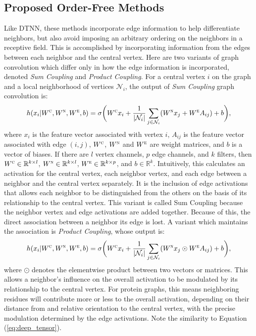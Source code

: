 \subsection{Proposed Order-Free Methods}
Like DTNN, these methods incorporate edge information to help differentiate neighbors, but also avoid imposing an arbitrary ordering on the neighbors in a receptive field.
This is accomplished by incorporating information from the edges between each neighbor and the central vertex.
Here are two variants of graph convolution which differ only in how the edge information is incorporated, denoted \textit{Sum Coupling} and \textit{Product Coupling}.
For a central vertex $i$ on the graph and a local neighborhood of vertices $\mathcal{N}_i$, the output of \emph{Sum Coupling} graph convolution is:
\begin{equation}
h(x_i | W^\textsc{c}, W^\textsc{n}, W^\textsc{e}, b) = \sigma \bigg( W^{\textsc{c}} x_i + \frac{1}{|\mathcal{N}_i|}\sum_{j \in \mathcal{N}_i} (W^{\textsc{n}} x_j + W^{\textsc{e}} A_{ij}) + b \bigg),
\label{eq:sum_coupling}
\end{equation}
where $x_i$ is the feature vector associated with vertex $i$, $A_{ij}$ is the feature vector associated with edge $(i, j)$, $W^\textsc{c}$, $W^\textsc{n}$ and $W^\textsc{e}$ are weight matrices, and $b$ is a vector of biases. 
If there are $l$ vertex channels, $p$ edge channels, and $k$ filters, then $W^\textsc{c}\in\mathbb{R}^{k \times l}$, $W^\textsc{n}\in\mathbb{R}^{k \times l}$, $W^\textsc{e}\in\mathbb{R}^{k \times p}$, and $b\in\mathbb{R}^{k}$.
Intuitively, this calculates an activation for the central vertex, each neighbor vertex, and each edge between a neighbor and the central vertex separately.
It is the inclusion of edge activations that allows each neighbor to be distinguished from the others on the basis of its relationship to the central vertex.
This variant is called Sum Coupling because the neighbor vertex and edge activations are added together.
Because of this, the direct association between a neighbor its edge is lost.
A variant which maintains the association is \emph{Product Coupling}, whose output is:
\begin{equation}
h(x_i | W^\textsc{c}, W^\textsc{n}, W^\textsc{e}, b) = \sigma \bigg( W^{\textsc{c}} x_i + \frac{1}{|\mathcal{N}_i|}\sum_{j \in \mathcal{N}_i} (W^{\textsc{n}} x_j \odot W^{\textsc{e}} A_{ij}) + b \bigg),
\label{eq:prod_coupling}
\end{equation}
where $\odot$ denotes the elementwise product between two vectors or matrices. 
This allows a neighbor's influence on the overall activation to be modulated by its relationship to the central vertex.
For protein graphs, this means neighboring residues will contribute more or less to the overall activation, depending on their distance from and relative orientation to the central vertex, with the precise modulation determined by the edge activations.
Note the similarity to Equation (\ref{eq:deep_tensor}).

